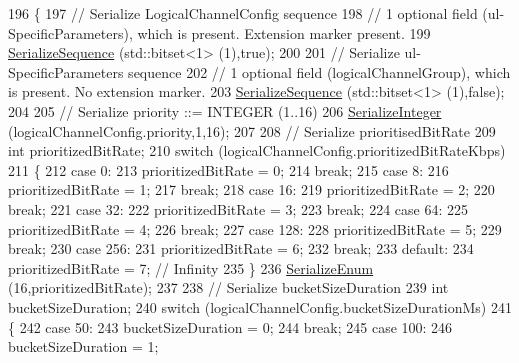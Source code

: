\begin{DoxyCode}
196 \{
197   \textcolor{comment}{// Serialize LogicalChannelConfig sequence}
198   \textcolor{comment}{// 1 optional field (ul-SpecificParameters), which is present. Extension marker present.}
199   \hyperlink{classns3_1_1Asn1Header_aa9744858380443ed95836fed08799aed}{SerializeSequence} (std::bitset<1> (1),\textcolor{keyword}{true});
200 
201   \textcolor{comment}{// Serialize ul-SpecificParameters sequence}
202   \textcolor{comment}{// 1 optional field (logicalChannelGroup), which is present. No extension marker.}
203   \hyperlink{classns3_1_1Asn1Header_aa9744858380443ed95836fed08799aed}{SerializeSequence} (std::bitset<1> (1),\textcolor{keyword}{false});
204 
205   \textcolor{comment}{// Serialize priority ::= INTEGER (1..16)}
206   \hyperlink{classns3_1_1Asn1Header_ab1c3bd37730affa7473bc759d625c29a}{SerializeInteger} (logicalChannelConfig.priority,1,16);
207 
208   \textcolor{comment}{// Serialize prioritisedBitRate}
209   \textcolor{keywordtype}{int} prioritizedBitRate;
210   \textcolor{keywordflow}{switch} (logicalChannelConfig.prioritizedBitRateKbps)
211     \{
212     \textcolor{keywordflow}{case} 0:
213       prioritizedBitRate = 0;
214       \textcolor{keywordflow}{break};
215     \textcolor{keywordflow}{case} 8:
216       prioritizedBitRate = 1;
217       \textcolor{keywordflow}{break};
218     \textcolor{keywordflow}{case} 16:
219       prioritizedBitRate = 2;
220       \textcolor{keywordflow}{break};
221     \textcolor{keywordflow}{case} 32:
222       prioritizedBitRate = 3;
223       \textcolor{keywordflow}{break};
224     \textcolor{keywordflow}{case} 64:
225       prioritizedBitRate = 4;
226       \textcolor{keywordflow}{break};
227     \textcolor{keywordflow}{case} 128:
228       prioritizedBitRate = 5;
229       \textcolor{keywordflow}{break};
230     \textcolor{keywordflow}{case} 256:
231       prioritizedBitRate = 6;
232       \textcolor{keywordflow}{break};
233     \textcolor{keywordflow}{default}:
234       prioritizedBitRate = 7;          \textcolor{comment}{// Infinity}
235     \}
236   \hyperlink{classns3_1_1Asn1Header_ac8e56956823ab8e4470c09e162e7bf24}{SerializeEnum} (16,prioritizedBitRate);
237 
238   \textcolor{comment}{// Serialize bucketSizeDuration}
239   \textcolor{keywordtype}{int} bucketSizeDuration;
240   \textcolor{keywordflow}{switch} (logicalChannelConfig.bucketSizeDurationMs)
241     \{
242     \textcolor{keywordflow}{case} 50:
243       bucketSizeDuration = 0;
244       \textcolor{keywordflow}{break};
245     \textcolor{keywordflow}{case} 100:
246       bucketSizeDuration = 1;

\end{DoxyCode}
